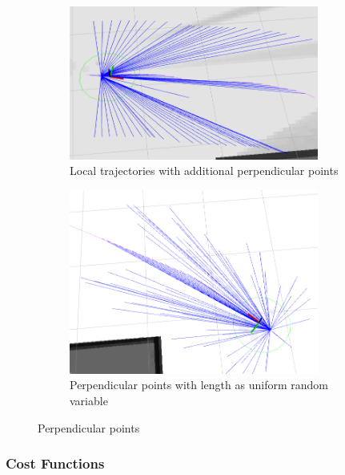 \documentclass[capstone_report.tex]{subfiles}
\begin{document}
\begin{figure}[H]
    \centering
    \begin{subfigure}{0.5\textwidth}
        \centering
        \includegraphics[width=0.9\textwidth]{imgs/local_traj_gen_perp.png}
        \caption{Local trajectories with additional perpendicular points}
    \end{subfigure}%
    \begin{subfigure}{0.5\textwidth}
        \centering
        \includegraphics[width=0.9\textwidth]{imgs/local_traj_gen_random.png}
        \caption{Perpendicular points with length as uniform random variable}
    \end{subfigure}
    \caption{Perpendicular points\label{fig:local_traj_gen_perp}}
\end{figure}

\subsubsection{Cost Functions}
\end{document}

